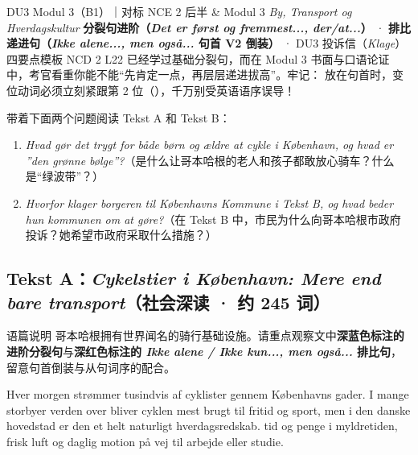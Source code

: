 {DU3 Modul 3（B1）｜对标 NCE 2 后半 \& Modul 3 \textit{By, Transport og Hverdagskultur}}
{\textbf{分裂句进阶（\textit{Det er først og fremmest..., der/at...}）} · \textbf{排比递进句（\textit{Ikke alene..., men også...} 句首 V2 倒装）} · DU3 投诉信（\textit{Klage}）四要点模板}
{NCD 2 L22 已经学过基础分裂句，而在 Modul 3 书面与口语论证中，考官看重你能不能“先肯定一点，再层层递进拔高”。牢记： 放在句首时，变位动词必须立刻紧跟第 2 位（），千万别受英语语序误导！}

\begin{foerduleaeser}
带着下面两个问题阅读 Tekst A 和 Tekst B：
\begin{enumerate}
  \item \textit{Hvad gør det trygt for både børn og ældre at cykle i København, og hvad er ”den grønne bølge”?}（是什么让哥本哈根的老人和孩子都敢放心骑车？什么是“绿波带”？）
  \item \textit{Hvorfor klager borgeren til Københavns Kommune i Tekst B, og hvad beder hun kommunen om at gøre?}（在 Tekst B 中，市民为什么向哥本哈根市政府投诉？她希望市政府采取什么措施？）
\end{enumerate}
\end{foerduleaeser}


\subsection*{Tekst A：\textit{Cykelstier i København: Mere end bare transport}（社会深读 · 约 245 词）}

\begin{tipbox}{语篇说明}
哥本哈根拥有世界闻名的骑行基础设施。请重点观察文中\textbf{\color{NCDNavy}深蓝色标注的进阶分裂句}与\textbf{\color{NCDRed}深红色标注的 \textit{Ikke alene / Ikke kun..., men også...} 排比句}，留意句首倒装与从句词序的配合。
\end{tipbox}

Hver morgen strømmer tusindvis af cyklister gennem Københavns gader. I mange storbyer verden over bliver cyklen mest brugt til fritid og sport, men i den danske hovedstad er den et helt naturligt hverdagsredskab.  tid og penge i myldretiden,  frisk luft og daglig motion på vej til arbejde eller studie.

